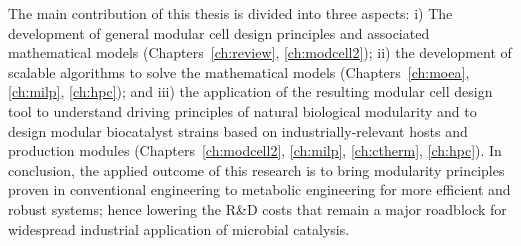 The main contribution of this thesis is divided into three aspects:
i) The development of general modular cell design principles and associated mathematical models (Chapters~\ref{ch:review}, \ref{ch:modcell2});
ii) the development of scalable algorithms to solve the mathematical models (Chapters~\ref{ch:moea}, \ref{ch:milp}, \ref{ch:hpc});
and iii) the application of the resulting modular cell design tool to understand driving principles of natural biological modularity and to design modular biocatalyst strains based on industrially-relevant hosts and production modules (Chapters~\ref{ch:modcell2}, \ref{ch:milp}, \ref{ch:ctherm}, \ref{ch:hpc}). %
In conclusion, the applied outcome of this research is to bring modularity principles proven in conventional engineering to metabolic engineering for more efficient and robust systems;
hence lowering the R\&D costs that remain a major roadblock for widespread industrial application of microbial catalysis.




